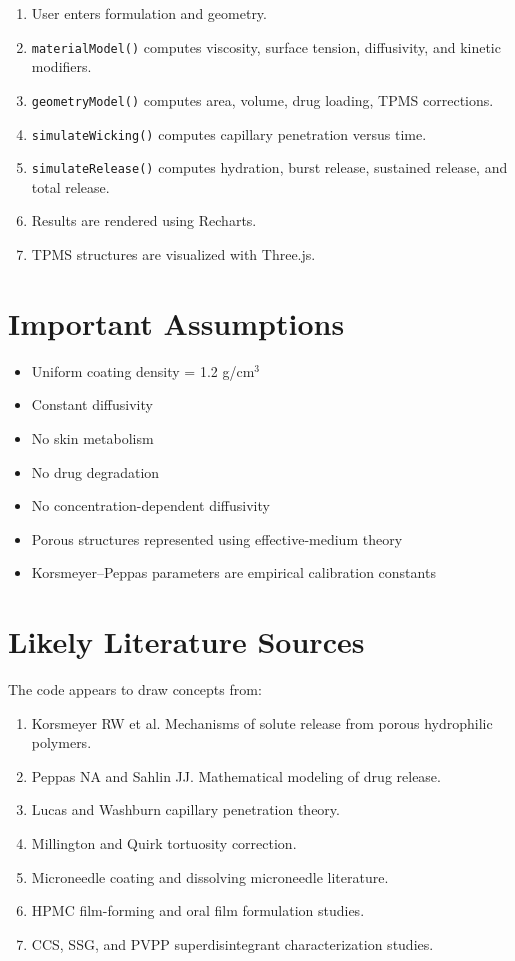 \documentclass[11pt]{article}
\begin{document}
\begin{enumerate}
\item User enters formulation and geometry.
\item \texttt{materialModel()} computes viscosity, surface tension, diffusivity, and kinetic modifiers.
\item \texttt{geometryModel()} computes area, volume, drug loading, TPMS corrections.
\item \texttt{simulateWicking()} computes capillary penetration versus time.
\item \texttt{simulateRelease()} computes hydration, burst release, sustained release, and total release.
\item Results are rendered using Recharts.
\item TPMS structures are visualized with Three.js.
\end{enumerate}

\section{Important Assumptions}

\begin{itemize}
\item Uniform coating density = 1.2 g/cm$^3$
\item Constant diffusivity
\item No skin metabolism
\item No drug degradation
\item No concentration-dependent diffusivity
\item Porous structures represented using effective-medium theory
\item Korsmeyer--Peppas parameters are empirical calibration constants
\end{itemize}

\section{Likely Literature Sources}

The code appears to draw concepts from:

\begin{enumerate}
\item Korsmeyer RW et al. Mechanisms of solute release from porous hydrophilic polymers.
\item Peppas NA and Sahlin JJ. Mathematical modeling of drug release.
\item Lucas and Washburn capillary penetration theory.
\item Millington and Quirk tortuosity correction.
\item Microneedle coating and dissolving microneedle literature.
\item HPMC film-forming and oral film formulation studies.
\item CCS, SSG, and PVPP superdisintegrant characterization studies.
\end{enumerate}
\end{document}
